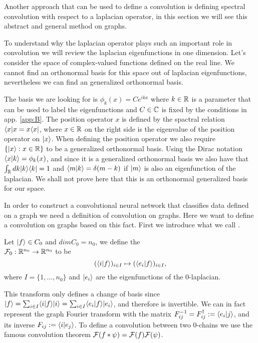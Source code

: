 \documentclass[../3.tex]{subfiles}
\begin{document}
    Another approach that can be used to define a convolution is defining spectral convolution with respect to a laplacian operator, in this section
    we will see this abstract and general method on graphs.

    {\color{blue}

    To understand why the laplacian operator plays such an important role in convolution we will review the laplacian eigenfunctions in one dimension.
    Let's consider the space of complex-valued functions defined on the real line. We cannot find an orthonormal basis for this space out of laplacian
    eigenfunctions, nevertheless we can find an generalized orthonormal basis.

    The basis we are looking for is $\phi_k(x) = C e^{ikx}$ where $k \in \mathbb{R}$ is a parameter that can be used to label the eigenfunctions
    and $C \in \mathbb{C}$ is fixed by the conditions in app. \ref{app:B}.
    The position operator $x$ is defined by the spactral relation $\langle x |x = x\langle x |$, where $x \in \mathbb{R}$ on the right side is the eigenvalue of the position operator
    on $| x \rangle$. When defining the position operator we also require $\{ | x \rangle : x \in \mathbb{R}\}$ to be a generalized orthonormal basis.
    Using the Dirac notation $\langle x | k \rangle = \phi_k(x)$, and since it is a generalized orthonormal basis we also have that
    $\int_{\mathbb{R}} dk | k \rangle\langle k | = 1$ and $\langle m | k \rangle = \delta(m-k)$ if $| m \rangle$ is also an eigenfunction of the laplacian.
    We shall not prove here that this is an orthonormal generalized basis for our space.

    }

    In order to construct a convolutional neural network that classifies data defined on a graph we need a definition of convolution on graphs.
    Here we want to define a convolution on graphs based on this fact. First we introduce what we call .
    
    \begin{defn}
        Let $| f \rangle \in C_0$ and $dimC_0 = n_0$, we define the \\
        $\mathcal{F}_0 : \mathbb{R}^{n_0} \to \mathbb{R}^{n_0}$ to be
        \[ (\langle i | f \rangle)_{i \in I} \mapsto (\langle e_i | f \rangle)_{i \in I},\]
        where $I = \{1,...,n_0\}$ and $| e_i \rangle$ are the eigenfunctions of the $0$-laplacian.
    \end{defn}

    This transform only defines a change of basis since $| f \rangle = \sum_{i \in I}\langle i | f \rangle| i \rangle = \sum_{i \in I}\langle e_i | f \rangle| e_i \rangle$, and therefore is invertible.
    We can in fact represent the graph Fourier transform with the matrix $F^{-1}_{ij} = F^\dagger_{ij} := \langle e_i | j \rangle$, and its inverse $F_{ij} := \langle i | e_j \rangle$.
    To define a convolution between two $0$-chains we use the famous convolution theorem $\mathcal{F}(f * \psi) = \mathcal{F}(f)\mathcal{F}(\psi)$. 
\end{document}
